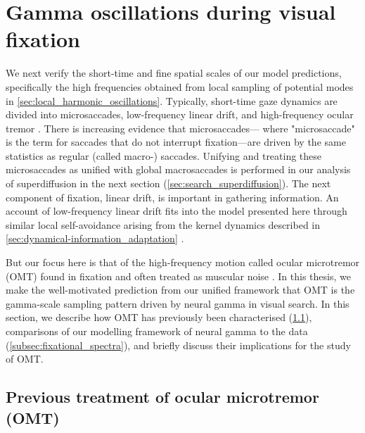 \section{Gamma oscillations during visual fixation}\label{sec:gamma_oscillations}
We next verify the short-time and fine spatial scales of our model predictions, specifically the high frequencies obtained from local sampling of potential modes in \cref{sec:local_harmonic_oscillations}. Typically, short-time gaze dynamics are divided into microsaccades, low-frequency linear drift, and high-frequency ocular tremor \cite{rucci_control_2015}. There is increasing evidence that microsaccades--- where "microsaccade" is the term for saccades that do not interrupt fixation---are driven by the same statistics as regular (called macro-) saccades. Unifying and treating these microsaccades as unified with global macrosaccades is performed in our analysis of superdiffusion in the next section (\cref{sec:search_superdiffusion}). The next component of fixation, linear drift, is important in gathering information. An account of low-frequency linear drift fits into the model presented here through similar local self-avoidance arising from the kernel dynamics described in \cref{sec:dynamical-information_adaptation} \cite{engbert_integrated_2011}. 

But our focus here is that of the high-frequency motion called ocular microtremor (OMT) found in fixation \cite{graham_ocular_2023, higgins_frequency_1953, bolger_dominant_1999} and often treated as muscular noise \cite{roberts_fixational_2013, greschner_retinal_2002, graham_ocular_2023}. In this thesis, we make the well-motivated prediction from our unified framework that OMT is the gamma-scale sampling pattern driven by neural gamma in visual search. In this section, we describe how OMT has previously been characterised (\cref{subsec:previous_treatment_of_OMT}), comparisons of our modelling framework of neural gamma to the data (\cref{subsec:fixational_spectra}), and briefly discuss their implications for the study of OMT. 
\subsection{Previous treatment of ocular microtremor (OMT)}\label{subsec:previous_treatment_of_OMT}

